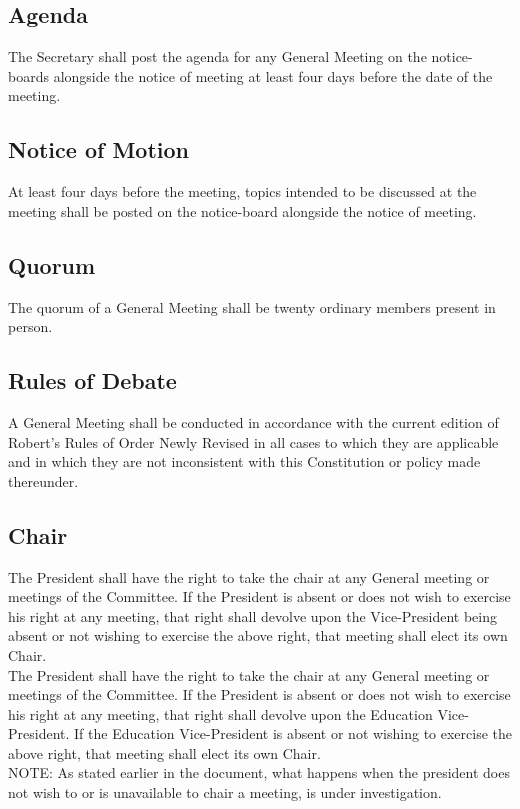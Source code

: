 \documentclass[11pt]{article} %
\begin{document}
\subsection{Agenda}
The Secretary shall post the agenda for any General Meeting on the notice-boards alongside the notice of meeting at least four days before the date of the meeting.

\subsection{Notice of Motion}
At least four days before the meeting, topics intended to be discussed at the meeting shall be posted on the notice-board alongside the notice of meeting.

\subsection{Quorum}
The quorum of a General Meeting shall be twenty ordinary members present in person.

\subsection{Rules of Debate}
A General Meeting shall be conducted in accordance with the current edition of Robert’s Rules of Order Newly Revised in all cases to which they are applicable and in which they are not inconsistent with this Constitution or policy made thereunder.

\subsection{Chair}
{\color{red}The President shall have the right to take the chair at any General meeting or meetings of the Committee. If the President is absent or does not wish to exercise his right at any meeting, that right shall devolve upon the Vice-President being absent or not wishing to exercise the above right, that meeting shall elect its own Chair.}\\
{\color{ForestGreen}The President shall have the right to take the chair at any General meeting or meetings of the Committee. If the President is absent or does not wish to exercise his right at any meeting, that right shall devolve upon the Education Vice-President.  If the Education Vice-President is absent or not wishing to exercise the above right, that meeting shall elect its own Chair.}\\
{\color{Cyan}NOTE:
As stated earlier in the document, what happens when the president does not wish to or is unavailable to chair a meeting, is under investigation.}
\end{document}
